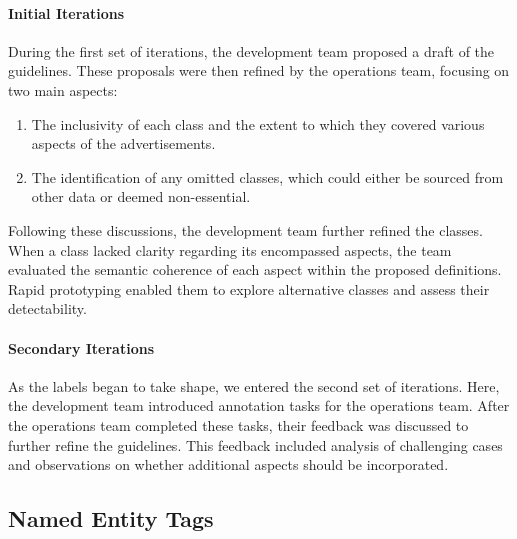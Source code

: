 \documentclass[11pt]{article}
\begin{document}
\paragraph{Initial Iterations}

During the first set of iterations, the development team proposed a draft of the guidelines. These proposals were then refined by the operations team, focusing on two main aspects: 
\begin{enumerate}
\itemsep0em
    \item The inclusivity of each class and the extent to which they covered various aspects of the advertisements.
    \item The identification of any omitted classes, which could either be sourced from other data or deemed non-essential.
\end{enumerate}

\noindent

Following these discussions, the development team further refined the classes. When a class lacked clarity regarding its encompassed aspects, the team evaluated the semantic coherence of each aspect within the proposed definitions. Rapid prototyping enabled them to explore alternative classes and assess their detectability.

\paragraph{Secondary Iterations}

As the labels began to take shape, we entered the second set of iterations. Here, the development team introduced annotation tasks for the operations team. After the operations team completed these tasks, their feedback was discussed to further refine the guidelines. This feedback included analysis of challenging cases and observations on whether additional aspects should be incorporated.


\subsection{Named Entity Tags}
\end{document}
